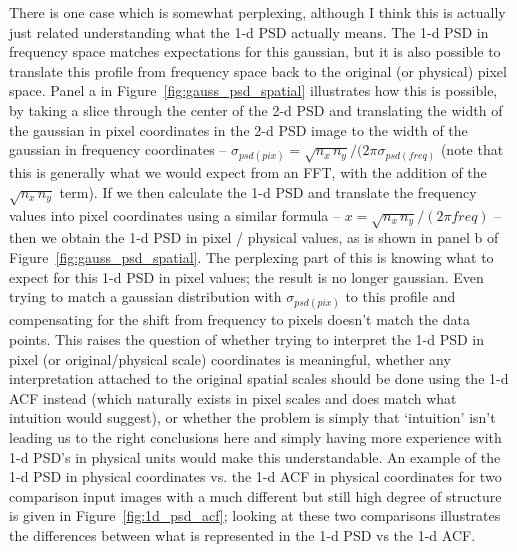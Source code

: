 \documentclass[11pt,preprint]{aastex}
\begin{document}
There is one case which is somewhat perplexing, although I think this is actually just related understanding what the 1-d PSD actually means. The 1-d PSD in frequency space matches expectations for this gaussian, but it is also possible to translate this profile from frequency space back to the original (or physical) pixel space. Panel a in Figure~\ref{fig:gauss_psd_spatial} illustrates how this is possible, by taking a slice through the center of the 2-d PSD and translating the width of the gaussian in pixel coordinates in the 2-d PSD image to the width of the gaussian in frequency coordinates -- $\sigma_{psd(pix)} = \sqrt{n_x\, n_y} / (2 \pi \sigma_{psd(freq)}$ (note that this is generally what we would expect from an FFT, with the addition of the $\sqrt{n_x\,n_y}$ term). If we then calculate the 1-d PSD and translate the frequency values into pixel coordinates using a similar formula -- $x = \sqrt{n_x\,n_y} / (2 \pi freq)$ -- then we obtain the 1-d PSD in pixel / physical values, as is shown in panel b of Figure~\ref{fig:gauss_psd_spatial}.  The perplexing part of this is knowing what to expect for this 1-d PSD in pixel values; the result is no longer gaussian. Even trying to match a gaussian distribution with $\sigma_{psd(pix)}$ to this profile and compensating for the shift from frequency to pixels doesn't match the data points. This raises the question of whether trying to interpret the 1-d PSD in pixel (or original/physical scale) coordinates is meaningful, whether any interpretation attached to the original spatial scales should be done using the 1-d ACF instead (which naturally exists in pixel scales and does match what intuition would suggest), or whether the problem is simply that `intuition' isn't leading us to the right conclusions here and simply having more experience with 1-d PSD's in physical units would make this understandable. An example of the 1-d PSD in physical coordinates vs. the 1-d ACF in physical coordinates for two comparison input images with a much different but still high degree of structure is given in Figure~\ref{fig:1d_psd_acf}; looking at these two comparisons illustrates the differences between what is represented in the 1-d PSD vs the 1-d ACF.  \label{q:1dpsd}
\end{document}
